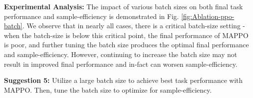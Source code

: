 \documentclass{article}
\theoremstyle{plain}
\theoremstyle{definition}
\theoremstyle{remark}
\begin{document}

\textbf{Experimental Analysis:} The impact of various batch sizes on both final task performance and sample-efficiency is demonstrated in Fig. \ref{fig:Ablation-ppo-batch}. We observe that in nearly all cases, there is a critical batch-size setting - when the batch-size is below this critical point, the final performance of MAPPO is poor, and further tuning the batch size produces the optimal final performance and sample-efficiency.
However, continuing to increase the batch size may not result in improved final performance and in-fact can worsen sample-efficiency. 










\textbf{Suggestion 5:} Utilize a large batch size to achieve best task performance with MAPPO. Then, tune the batch size to optimize for sample-efficiency. 
\vspace{-2mm}
\end{document}
